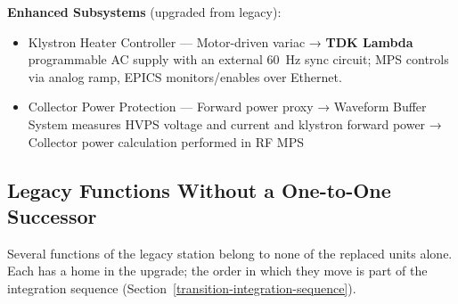{\noindent\textbf{Enhanced Subsystems} (upgraded from legacy):

\begin{itemize}
\tightlist
\item
  Klystron Heater Controller --- Motor-driven variac → \textbf{TDK Lambda} programmable AC supply with an external \qty{60}{\hertz} sync circuit; MPS controls via analog ramp, EPICS monitors/enables over Ethernet.
\item
  Collector Power Protection --- Forward power proxy → Waveform Buffer System measures HVPS voltage and current and klystron forward power → Collector power calculation performed in RF MPS
\end{itemize}

\subsection{Legacy Functions Without a One-to-One Successor}\label{legacy-functions}

Several functions of the legacy station belong to none of the replaced units alone. Each has a home in the upgrade; the order in which they move is part of the integration sequence (Section~\ref{transition-integration-sequence}).

}
